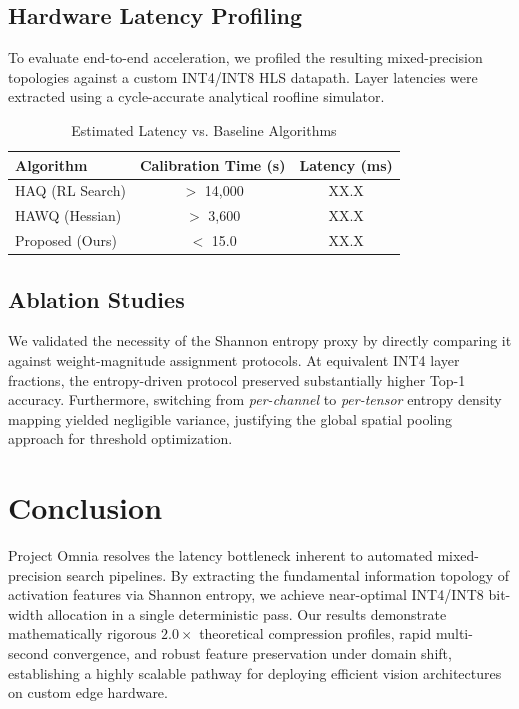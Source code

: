 \documentclass[journal]{IEEEtran}
\begin{document}
\subsection{Hardware Latency Profiling}
To evaluate end-to-end acceleration, we profiled the resulting mixed-precision topologies against a custom INT4/INT8 HLS datapath. Layer latencies were extracted using a cycle-accurate analytical roofline simulator.

\begin{table}[htbp]
\caption{Estimated Latency vs. Baseline Algorithms}
\begin{center}
\begin{tabular}{|l|c|c|}
\hline
\textbf{Algorithm} & \textbf{Calibration Time (s)} & \textbf{Latency (ms)} \\
\hline
HAQ (RL Search) & $>$ 14,000 & XX.X \\
HAWQ (Hessian) & $>$ 3,600 & XX.X \\
Proposed (Ours) & $<$ 15.0 & XX.X \\
\hline
\end{tabular}
\label{tab:latency}
\end{center}
\end{table}

\subsection{Ablation Studies}
We validated the necessity of the Shannon entropy proxy by directly comparing it against weight-magnitude assignment protocols. At equivalent INT4 layer fractions, the entropy-driven protocol preserved substantially higher Top-1 accuracy. Furthermore, switching from \textit{per-channel} to \textit{per-tensor} entropy density mapping yielded negligible variance, justifying the global spatial pooling approach for threshold optimization.

\section{Conclusion}
Project Omnia resolves the latency bottleneck inherent to automated mixed-precision search pipelines. By extracting the fundamental information topology of activation features via Shannon entropy, we achieve near-optimal INT4/INT8 bit-width allocation in a single deterministic pass. Our results demonstrate mathematically rigorous $2.0\times$ theoretical compression profiles, rapid multi-second convergence, and robust feature preservation under domain shift, establishing a highly scalable pathway for deploying efficient vision architectures on custom edge hardware.
\end{document}
